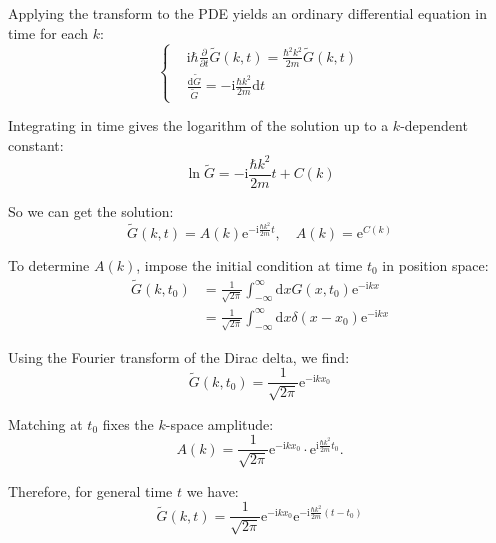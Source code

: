 \begin{example}
    Applying the transform to the PDE yields an ordinary differential equation in time for each $k$:
    \begin{equation}
        \left\{
        \begin{aligned}
        &\mathrm{i}\hbar \frac{\partial}{\partial t} \tilde{G}(k,t) = \frac{\hbar^2 k^2}{2m} \tilde{G}(k,t)\\
        &\frac{\mathrm{d}\tilde{G}}{\tilde{G}} = -\mathrm{i} \frac{\hbar k^2}{2m} \mathrm{d}t
        \end{aligned}
        \right.
    \end{equation}

    Integrating in time gives the logarithm of the solution up to a $k$-dependent constant:
    \begin{equation}
    \ln \tilde{G} = -\mathrm{i} \frac{\hbar k^2}{2m} t + C(k)
    \end{equation}

    So we can get the solution:
    \begin{equation}
    \tilde{G}(k,t) = A(k) \mathrm{e}^{-\mathrm{i}\frac{\hbar k^2}{2m}t}, \quad A(k) = \mathrm{e}^{C(k)}
    \end{equation}

    To determine $A(k)$, impose the initial condition at time $t_0$ in position space:
    \begin{equation}
    \begin{aligned}
    \tilde{G}(k, t_0) &= \frac{1}{\sqrt{2\pi}} \int_{-\infty}^{\infty} \mathrm{d}x G(x, t_0) \mathrm{e}^{-\mathrm{i}kx} \\
    &= \frac{1}{\sqrt{2\pi}} \int_{-\infty}^{\infty} \mathrm{d}x \delta(x-x_0) \mathrm{e}^{-\mathrm{i}kx}
    \end{aligned}
    \end{equation}

    Using the Fourier transform of the Dirac delta, we find:
    \begin{equation}
    \tilde{G}(k, t_0) = \frac{1}{\sqrt{2\pi}} \mathrm{e}^{-\mathrm{i}kx_0}
    \end{equation}

    Matching at $t_0$ fixes the $k$-space amplitude:
    \begin{equation}
    A(k) = \frac{1}{\sqrt{2\pi}} \mathrm{e}^{-\mathrm{i}kx_0} \cdot \mathrm{e}^{\mathrm{i}\frac{\hbar k^2}{2m}t_0}.
    \end{equation}

    Therefore, for general time $t$ we have:
    \begin{equation}
    \tilde{G}(k,t) = \frac{1}{\sqrt{2\pi}} \mathrm{e}^{-\mathrm{i}kx_0} \mathrm{e}^{-\mathrm{i}\frac{\hbar k^2}{2m}(t-t_0)}
    \end{equation}


\end{example}
